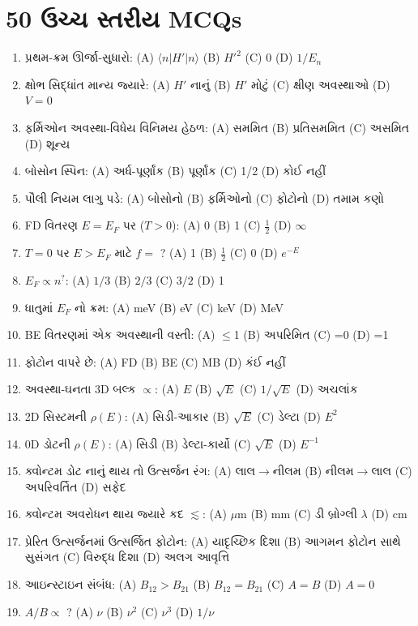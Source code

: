 \section{50 ઉચ્ચ સ્તરીય MCQs}

\begin{enumerate}[label=\textbf{\arabic*.}]
  \item પ્રથમ-ક્રમ ઊર્જા-સુધારો: (A) $\langle n|H'|n\rangle$ (B) $H'^{2}$ (C) 0 (D) $1/E_n$
  \item ક્ષોભ સિદ્ધાંત માન્ય જ્યારે: (A) $H'$ નાનું (B) $H'$ મોટું (C) ક્ષીણ અવસ્થાઓ (D) $V=0$
  \item ફર્મિઓન અવસ્થા-વિધેય વિનિમય હેઠળ: (A) સમમિત (B) પ્રતિસમમિત (C) અસમિત (D) શૂન્ય
  \item બોસોન સ્પિન: (A) અર્ધ-પૂર્ણાંક (B) પૂર્ણાંક (C) 1/2 (D) કોઈ નહીં
  \item પૌલી નિયમ લાગુ પડે: (A) બોસોનો (B) ફર્મિઓનો (C) ફોટોનો (D) તમામ કણો
  \item FD વિતરણ $E=E_F$ પર ($T>0$): (A) 0 (B) 1 (C) $\tfrac12$ (D) $\infty$
  \item $T=0$ પર $E>E_F$ માટે $f=$ ? (A) 1 (B) $\tfrac12$ (C) 0 (D) $e^{-E}$
  \item $E_F\propto n^{?}$: (A) $1/3$ (B) $2/3$ (C) $3/2$ (D) 1
  \item ધાતુમાં $E_F$ નો ક્રમ: (A) meV (B) eV (C) keV (D) MeV
  \item BE વિતરણમાં એક અવસ્થાની વસ્તી: (A) $\le$1 (B) અપરિમિત (C) =0 (D) =1
  \item ફોટોન વાપરે છે: (A) FD (B) BE (C) MB (D) કંઈ નહીં
  \item અવસ્થા-ઘનતા 3D બલ્ક $\propto$: (A) $E$ (B) $\sqrt{E}$ (C) $1/\sqrt{E}$ (D) અચલાંક
  \item 2D સિસ્ટમની $\rho(E)$: (A) સિડી-આકાર (B) $\sqrt{E}$ (C) ડેલ્ટા (D) $E^{2}$
  \item 0D ડોટની $\rho(E)$: (A) સિડી (B) ડેલ્ટા-કાર્યો (C) $\sqrt{E}$ (D) $E^{-1}$
  \item ક્વોન્ટમ ડોટ નાનું થાય તો ઉત્સર્જન રંગ: (A) લાલ$\to$નીલમ (B) નીલમ$\to$લાલ (C) અપરિવર્તિત (D) સફેદ
  \item ક્વોન્ટમ અવરોધન થાય જ્યારે કદ $\lesssim$: (A) $\mu$m (B) mm (C) ડી બ્રોગ્લી $\lambda$ (D) cm
  \item પ્રેરિત ઉત્સર્જનમાં ઉત્સર્જિત ફોટોન: (A) યાદૃચ્છિક દિશા (B) આગમન ફોટોન સાથે સુસંગત (C) વિરુદ્ધ દિશા (D) અલગ આવૃત્તિ
  \item આઇન્સ્ટાઇન સંબંધ: (A) $B_{12}>B_{21}$ (B) $B_{12}=B_{21}$ (C) $A=B$ (D) $A=0$
  \item $A/B\propto$ ? (A) $\nu$ (B) $\nu^{2}$ (C) $\nu^{3}$ (D) $1/\nu$

\end{enumerate}
